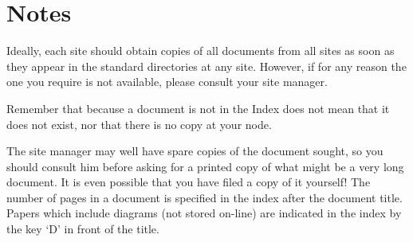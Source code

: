 \section{Notes}

Ideally, each site should obtain copies of all documents from all sites as soon
as they appear in the standard directories at any site. However, if for any
reason the one you require is not available, please consult your site manager.

Remember that because a document is not in the Index does not mean that it does
not exist, nor that there is no copy at your node.

The site manager may well have spare copies of the document sought, so you
should consult him before asking for a printed copy of what might be a very
long document. It is even possible that you have filed a copy of it yourself!
The number of pages in a document is specified in the index after the document
title. Papers which include diagrams (not stored on-line) are indicated in the
index by the key `D' in front of the title.


